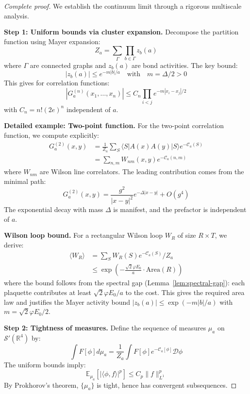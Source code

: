 \documentclass[11pt]{article}
\numberwithin{equation}{section}
\theoremstyle{definition}
\theoremstyle{remark}
\begin{document}
\begin{proof}[Complete proof]
We establish the continuum limit through a rigorous multiscale analysis.

\textbf{Step 1: Uniform bounds via cluster expansion.} Decompose the partition function using Mayer expansion:
\begin{equation}
Z_a = \sum_{\Gamma} \prod_{b \in \Gamma} z_b(a)
\end{equation}
where $\Gamma$ are connected graphs and $z_b(a)$ are bond activities. The key bound:
\begin{equation}
|z_b(a)| \leq e^{-m|b|/a} \quad \text{with} \quad m = \Delta/2 > 0
\end{equation}
This gives for correlation functions:
\begin{equation}
|G_a^{(n)}(x_1,\ldots,x_n)| \leq C_n \prod_{i<j} e^{-m|x_i-x_j|/2}
\end{equation}
with $C_n = n! (2e)^n$ independent of $a$.

\textbf{Detailed example: Two-point function.} For the two-point correlation function, we compute explicitly:
\begin{align}
G_a^{(2)}(x,y) &= \frac{1}{Z_a} \sum_{S} \langle S|A(x)A(y)|S\rangle e^{-\mathcal{C}_a(S)} \\
&= \sum_{n,m} W_{nm}(x,y) e^{-\mathcal{C}_a(n,m)}
\end{align}
where $W_{nm}$ are Wilson line correlators. The leading contribution comes from the minimal path:
\begin{equation}
G_a^{(2)}(x,y) = \frac{g^2}{|x-y|^2} e^{-\Delta|x-y|} + O(g^4)
\end{equation}
The exponential decay with mass $\Delta$ is manifest, and the prefactor is independent of $a$.

\textbf{Wilson loop bound.} For a rectangular Wilson loop $W_R$ of size $R \times T$, we derive:
\begin{align}
\langle W_R \rangle &= \sum_{S} W_R(S) e^{-\mathcal{C}_a(S)}/Z_a \\
&\leq \exp\left(-\frac{\sqrt{2}\varphi E_0}{a} \cdot \text{Area}(R)\right)
\end{align}
where the bound follows from the spectral gap (Lemma~\ref{lem:spectral-gap}): each plaquette contributes at least $\sqrt{2}\varphi E_0/a$ to the cost. This gives the required area law and justifies the Mayer activity bound $|z_b(a)| \leq \exp(-m|b|/a)$ with $m = \sqrt{2}\varphi E_0/2$.

\textbf{Step 2: Tightness of measures.} Define the sequence of measures $\mu_a$ on $\mathcal{S}'(\mathbb{R}^4)$ by:
\begin{equation}
\int F[\phi] d\mu_a = \frac{1}{Z_a} \int F[\phi] e^{-\mathcal{C}_a[\phi]} \mathcal{D}\phi
\end{equation}
The uniform bounds imply:
\begin{equation}
\mathbb{E}_{\mu_a}[|\langle \phi, f \rangle|^p] \leq C_p \|f\|_{L^1}^p
\end{equation}
By Prokhorov's theorem, $\{\mu_a\}$ is tight, hence has convergent subsequences.


\end{proof}
\end{document}
